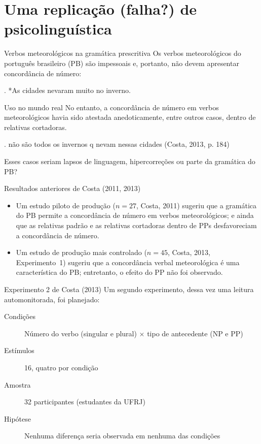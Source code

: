 \documentclass[numbering=fraction,aspectratio=169]{beamer}
\begin{document}

\section{Uma replicação (falha?) de psicolinguística}

\begin{frame}{Verbos meteorológicos na gramática prescritiva}
  Os \alert{verbos meteorológicos} do português brasileiro (PB) são impessoais e, portanto, \alert{não devem apresentar concordância de número}:

  \ex. *As cidades nevaram muito no inverno.


\end{frame}

\begin{frame}{Uso no mundo real}
  No entanto, a concordância de número em verbos meteorológicos havia sido atestada anedoticamente, entre outros casos, \alert{dentro de relativas cortadoras}.

  \ex. não são todos os invernos q nevam nessas cidades (Costa, 2013, p. 184)


  \pause
  Esses casos seriam lapsos de linguagem, hipercorreções ou parte da gramática do PB?
\end{frame}

\begin{frame}{Resultados anteriores de Costa (2011, 2013)}
    \begin{itemize}
    \item Um estudo piloto de produção ($n = 27$, Costa, 2011) sugeriu que \alert<1>{a gramática do PB permite a concordância de número em verbos meteorológicos}; e ainda que as relativas padrão e as relativas cortadoras dentro de PPs desfavoreciam a concordância de número. \pause
    \item Um estudo de produção mais controlado ($n = 45$, Costa, 2013, Experimento~1) sugeriu que a \alert<2>{concordância verbal meteorológica é uma característica do PB}; entretanto, o efeito do PP não foi observado.
    \end{itemize}
\end{frame}

\begin{frame}{Experimento 2 de Costa (2013)}
  Um segundo experimento, dessa vez uma leitura automonitorada, foi planejado:

  \begin{description}
  \item[Condições] Número do verbo (singular e plural) × tipo de antecedente (NP e PP)
  \item[Estímulos] 16, quatro por condição
  \item[Amostra] 32 participantes (estudantes da UFRJ)
  \item[Hipótese] \alert{Nenhuma diferença seria observada em nenhuma das condições}
  \end{description}
\end{frame}
\end{document}
